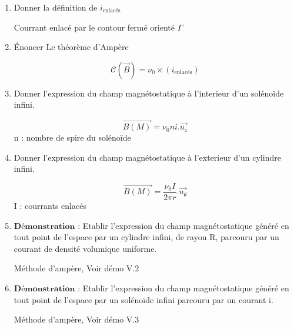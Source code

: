 \documentclass{article}
\begin{document}
\begin{enumerate}[label=\arabic{enumi} - , left=0pt, itemsep=1em]
    \item Donner la définition de $i_{\text{enlacés}}$ \par
    \begin{solution}
         Courrant enlacé par le contour fermé orienté $\Gamma$
    \end{solution}

    \item Énoncer Le théorème d'Ampère \par
    \begin{solution}
         \[ \mathscr{C}(\vec{B}) = \nu_0 \times (i_{\text{enlacés}})\]
    \end{solution}
    
    \item Donner l'expression du champ magnétostatique à l'interieur d'un solénoïde infini.\par
    \begin{solution}
         \[ \vec{B(M)} = \nu_0 n i . \vec{u_z}\] n : nombre de spire du solénoïde
    \end{solution}

    \item Donner l'expression du champ magnétostatique à l'exterieur d'un cylindre infini.\par
    \begin{solution}
         \[ \vec{B(M)} = \frac{\nu_0 I}{2 \pi r} . \vec{u_{\theta}}\] I : courrants enlacés
    \end{solution}

    \item  $\textbf{Démonstration :}$ Etablir l’expression du champ magnétostatique généré en tout point de l’espace par un
    cylindre infini, de rayon R, parcouru par un courant de densité volumique uniforme.\par
    \begin{solution}
         Méthode d'ampère, Voir démo V.2

    \end{solution}


    \item $\textbf{Démonstration :}$ Etablir l’expression du champ magnétostatique généré en tout point de l’espace par un
    solénoïde infini parcouru par un courant i.\par
    \begin{solution}
         Méthode d'ampère, Voir démo V.3

    \end{solution}


\end{enumerate}
\end{document}
